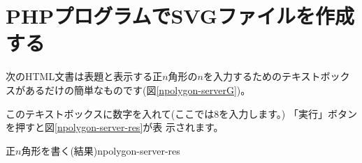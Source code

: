 \section{PHPプログラムでSVGファイルを作成する}
次のHTML文書は表題と表示する正$n$角形の$n$を入力するためのテキストボック
スがあるだけの簡単なものです(図\ref{npolygon-serverG})。


このテキストボックスに数字を入れて(ここでは$8$を入力します。)
「実行」ボタンを押すと図\ref{npolygon-server-res}が表
示されます。

{正$n$角形を書く(結果)}{npolygon-server-res}


